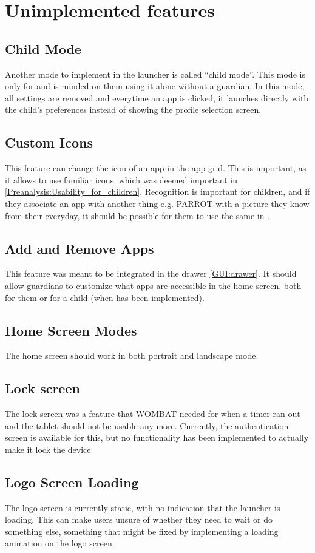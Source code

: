 \section{Unimplemented features}
\label{backlog_unimplemented}

\subsection{Child Mode}
\label{backlog:child_mode}
Another mode to implement in the launcher is called "`child mode"'. 
This mode is only for \autists[] and is minded on them using it alone without a guardian. 
In this mode, all settings are removed and everytime an app is clicked, it launches directly with the child's preferences instead of showing the profile selection screen.

\subsection{Custom Icons}
\label{backlog:custom_icons}
This feature can change the icon of an app in the app grid. 
This is important, as it allows \autists[] to use familiar icons, which was deemed important in \autoref{Preanalysis:Usability_for_children}. 
Recognition is important for children, and if they associate an app with another thing e.g. PARROT with a picture they know from their everyday, it should be possible for them to use the same in \giraf[].

\subsection{Add and Remove Apps}
\label{backlog:hide_apps}
This feature was meant to be integrated in the drawer \autoref{GUI:drawer}. 
It should allow guardians to customize what apps are accessible in the home screen, both for them or for a child (when  has been implemented). 

\subsection{Home Screen Modes}
\label{backlog:home_screen_modes}
The home screen should work in both portrait and landscape mode.

\subsection{Lock screen}
\label{backlog:lock_screen}
The lock screen was a feature that WOMBAT needed for when a timer ran out and the tablet should not be usable any more. 
Currently, the authentication screen is available for this, but no functionality has been implemented to actually make it lock the device. 

\subsection{Logo Screen Loading}
\label{backlog:logo_screen_loading}
The logo screen is currently static, with no indication that the launcher is loading. 
This can make users unsure of whether they need to wait or do something else, something that might be fixed by implementing a loading animation on the logo screen.